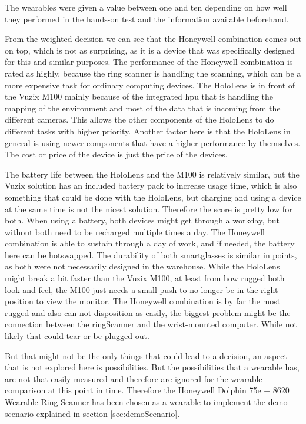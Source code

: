The wearables were given a value between one and ten depending on how well they performed in the hands-on test and the information available beforehand.

From the weighted decision we can see that the Honeywell combination comes out on top, which is not as surprising, as it is a device that was specifically designed for this and similar purposes. The performance of the Honeywell combination is rated as highly, because the ring scanner is handling the scanning, which can be a more expensive task for ordinary computing devices. The HoloLens is in front of the Vuzix M100 mainly because of the integrated \gls{hpu} that is handling the mapping of the environment and most of the data that is incoming from the different cameras. This allows the other components of the HoloLens to do different tasks with higher priority. Another factor here is that the HoloLens in general is using newer components that have a higher performance by themselves. The cost or price of the device is just the price of the devices. 

The battery life between the HoloLens and the M100 is relatively similar, but the Vuzix solution has an included battery pack to increase usage time, which is also something that could be done with the HoloLens, but charging and using a device at the same time is not the nicest solution. Therefore the score is pretty low for both. When using a \gls{battery}, both devices might get through a workday, but without both need to be recharged multiple times a day. The Honeywell combination is able to sustain through a day of work, and if needed, the battery here can be \gls{hotswap}ped. The durability of both \gls{smartglasses} is similar in points, as both were not necessarily designed in the warehouse. While the HoloLens might break a bit faster than the Vuzix M100, at least from how rugged both look and feel, the M100 just needs a small push to no longer be in the right position to view the monitor. The Honeywell combination is by far the most rugged and also can not disposition as easily, the biggest problem might be the connection between the \gls{ringScanner} and the wrist-mounted computer. While not likely that could tear or be plugged out.

But that might not be the only things that could lead to a decision, an aspect that is not explored here is possibilities. But the possibilities that a \gls{wearable} has, are not that easily measured and therefore are ignored for the wearable comparison at this point in time. Therefore the Honeywell Dolphin 75e + 8620 Wearable Ring Scanner has been chosen as a wearable to implement the demo scenario explained in section \ref{sec:demoScenario}.


